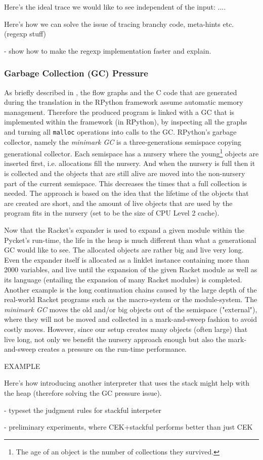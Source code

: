Here's the ideal trace we would like to see independent of the input: ....

Here's how we can solve the issue of tracing branchy code, meta-hints
etc. (regexp stuff)

- show how to make the regexp implementation faster and explain.


\subsubsection{Garbage Collection (GC) Pressure}

As briefly described in , the flow graphs and
the C code that are generated during the translation in the RPython
framework assume automatic memory management. Therefore the produced
program is linked with a GC that is implemented within the framework
(in RPython), by inspecting all the graphs and turning all
\texttt{malloc} operations into calls to the GC. RPython's garbage
collector, namely the \emph{minimark GC} is a three-generations
semispace copying generational collector. Each semispace has a nursery
where the young\footnote{The age of an object is the number of
  collections they survived.}  objects are inserted first,
i.e. allocations fill the nursery. And when the nursery is full then
it is collected and the objects that are still alive are moved into
the non-nursery part of the current semispace. This decreases the
times that a full collection is needed. The approach is based on the
idea that the lifetime of the objects that are created are short, and
the amount of live objects that are used by the program fits in the
nursery (set to be the size of CPU Level 2 cache). \cite{pypy06,
  bolz:14, gc:16, gc:12}

Now that the Racket's expander is used to expand a given module within
the Pycket's run-time, the life in the heap is much different than
what a generational GC would like to see. The allocated objects are
rather big and live very long. Even the expander itself is allocated
as a linklet instance containing more than 2000 variables, and live
until the expansion of the given Racket module as well as its language
(entailing the expansion of many Racket modules) is completed. Another
example is the long continuation chains caused by the large depth of
the real-world Racket programs such as the macro-system or the
module-system. The \emph{minimark GC} moves the old and/or big objects
out of the semispace ("external"), where they will not be moved and
collected in a mark-and-sweep fashion to avoid costly moves. However,
since our setup creates many objects (often large) that live long, not
only we benefit the nursery approach enough but also the
mark-and-sweep creates a pressure on the run-time performance.

EXAMPLE


Here's how introducing another interpreter that uses the stack might
help with the heap (therefore solving the GC pressure issue).

- typeset the judgment rules for stackful interpeter

- preliminary experiments, where CEK+stackful performs better than
just CEK

